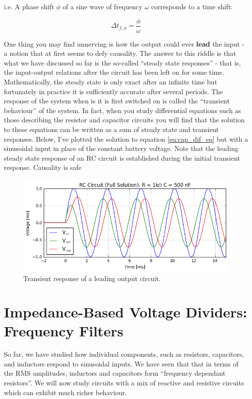 \documentclass{tufte-book}
\begin{document}
\noindent i.e. A phase shift $\phi$ of a sine wave of frequency $\omega$ corresponds to a time shift:

\begin{equation}\label{eq:phase_time_sine_2}
\Delta t_{f,\phi} = \frac{\phi}{\omega}
\end{equation}

One thing you may find unnerving is how the output could ever \textbf{lead} the input - a notion that at first seems to defy causality. The answer to this riddle is that what we have discussed so far is the so-called ``steady state responses'' - that is, the input-output relations after the circuit has been left on for some time. Mathematically, the steady state is only exact after an infinite time but fortunately in practice it is sufficiently accurate after several periods. The response of the system when is it is first switched on is called the ``transient behaviour'' of the system. In fact, when you study differential equations such as those describing the resistor and capacitor circuits you will find that the solution to these equations can be written as a sum of steady state and transient responses. Below, I've plotted the solution to equation \ref{eq:cap_dif_eq} but with a sinusoidal input in place of the constant battery voltage. Note that the leading steady state response of an RC circuit is established during the initial transient response. Causality is safe


\begin{figure}[h]
\caption{Transient response of a leading output circuit.}
\label{fig:RC_transient}
\begin{center}
\includegraphics[width=\textwidth]{RC_transient.png}
\end{center}
\end{figure}


\section{Impedance-Based Voltage Dividers: Frequency Filters}
So far, we have studied how individual components, such as resistors, capacitors, and inductors respond to sinusoidal inputs. We have seen that that in terms of the RMS amplitudes, inductors and capacitors form ``frequency dependant resistors''. We will now study circuits with a mix of reactive and resistive circuits which can exhibit much richer behaviour.
\end{document}
